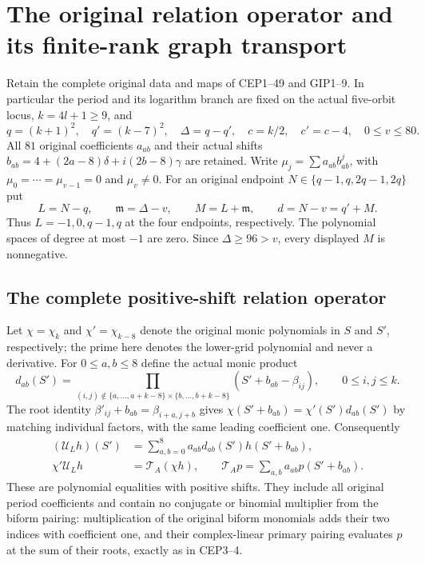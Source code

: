 \documentclass[11pt,a4paper]{article}
\begin{document}
\section{The original relation operator and its finite-rank graph transport}
\label{sec:ROG}

Retain the complete original data and maps of CEP1--49 and GIP1--9.
In particular the period and its logarithm branch are fixed on the
actual five-orbit locus, $k=4l+1\ge9$, and
\[
 q=(k+1)^2,\quad q'=(k-7)^2,\quad \Delta=q-q',\quad
 c=k/2,\quad c'=c-4,\quad 0\le v\le80.
 \tag{ROG1}
\]
All $81$ original coefficients $a_{ab}$ and their actual shifts
$b_{ab}=4+(2a-8)\delta+i(2b-8)\gamma$ are retained. Write
$\mu_j=\sum a_{ab}b_{ab}^j$, with $\mu_0=\cdots=\mu_{v-1}=0$
and $\mu_v\ne0$. For an original endpoint
$N\in\{q-1,q,2q-1,2q\}$ put
\[
 L=N-q,\qquad \mathfrak m=\Delta-v,\qquad
 M=L+\mathfrak m,\qquad d=N-v=q'+M.
 \tag{ROG2}
\]
Thus $L=-1,0,q-1,q$ at the four endpoints, respectively. The
polynomial spaces of degree at most $-1$ are zero. Since
$\Delta\ge96>v$, every displayed $M$ is nonnegative.

\subsection{The complete positive-shift relation operator}

Let $\chi=\chi_k$ and $\chi'=\chi_{k-8}$ denote the original
monic polynomials in $S$ and $S'$, respectively; the prime here
denotes the lower-grid polynomial and never a derivative.
For $0\le a,b\le8$ define the actual monic product
\[
 d_{ab}(S')=
 \prod_{(i,j)\notin\{a,\ldots,a+k-8\}\times\{b,\ldots,b+k-8\}}
       (S'+b_{ab}-\beta_{ij}),\qquad 0\le i,j\le k.
 \tag{ROG3}
\]
The root identity $\beta'_{ij}+b_{ab}=\beta_{i+a,j+b}$ gives
$\chi(S'+b_{ab})=\chi'(S')d_{ab}(S')$ by matching individual
factors, with the same leading coefficient one. Consequently
\[
 \begin{split}
 (\mathcal U_Lh)(S')
   &=\sum_{a,b=0}^8a_{ab}d_{ab}(S')h(S'+b_{ab}),\\
 \chi'\mathcal U_Lh&=\mathcal T_A(\chi h),\qquad
 \mathcal T_Ap=\sum_{a,b}a_{ab}p(S'+b_{ab}).
 \end{split}\tag{ROG4}
\]
These are polynomial equalities with positive shifts. They include
all original period coefficients and contain no conjugate or
binomial multiplier from the biform pairing: multiplication of
the original biform monomials adds their two indices with
coefficient one, and their complex-linear primary pairing evaluates
$p$ at the sum of their roots, exactly as in CEP3--4.
\end{document}
